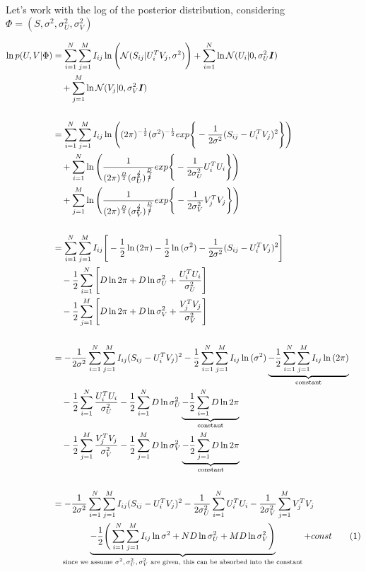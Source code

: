 Let's work with the log of the posterior distribution, considering $\Phi = (S,\sigma^{2},\sigma_{U}^{2},\sigma_{V}^{2})$

\begin{align*}
\ln{p(U,V|\Phi)} &= \sum_{i=1}^{N}\sum_{j=1}^{M} I_{ij}\ln{\Bigg(\mathcal{N}(S_{ij}|U^{T}_{i}V_{j},\sigma^{2})\Bigg)} + \sum_{i=1}^{N}\ln{\mathcal{N}(U_{i}|0,\sigma_{U}^{2}\boldsymbol{I})} \\&\quad 
+ \sum_{j=1}^{M}\ln{\mathcal{N}(V_{j}|0,\sigma_{V}^{2}\boldsymbol{I})}\\
&\\
&= \sum_{i=1}^{N}\sum_{j=1}^{M} I_{ij}\ln{\Bigg( (2\pi)^{-\frac{1}{2}}(\sigma^{2})^{-\frac{1}{2}} exp\Bigg\{-\frac{1}{2\sigma^{2}}(S_{ij} - U_{i}^{T}V_{j})^{2} \Bigg\}  \Bigg)} \\&\quad
+ \sum_{i=1}^{N} \ln{ \Bigg( \frac{1}{(2\pi)^{\frac{D}{2}}(\sigma_{U}^{\cancel{2}})^{\frac{D}{\cancel{2}}}} exp\Bigg\{ -\frac{1}{2\sigma_{U}^{2}} U_{i}^{T}U_{i} \Bigg\} \Bigg) } \\&\quad
+ \sum_{j=1}^{M} \ln{ \Bigg( \frac{1}{(2\pi)^{\frac{D}{2}}(\sigma_{V}^{\cancel{2}})^{\frac{D}{\cancel{2}}}} exp\Bigg\{ -\frac{1}{2\sigma_{V}^{2}} V_{j}^{T}V_{j} \Bigg\} \Bigg) }\\
&\\
&= \sum_{i=1}^{N}\sum_{j=1}^{M} I_{ij}\Bigg[-\frac{1}{2}\ln{(2\pi)} -\frac{1}{2}\ln{(\sigma^{2}) -\frac{1}{2\sigma^{2}}(S_{ij} - U_{i}^{T}V_{j})^{2}\Bigg]} \\&\quad
-\frac{1}{2} \sum_{i=1}^{N}\Bigg[ D\ln{2\pi} + D\ln{\sigma_{U}^{2}} + \frac{U_{i}^{T}U_{i}}{\sigma_{U}^{2}} \Bigg] \\&\quad
-\frac{1}{2} \sum_{j=1}^{M}\Bigg[ D\ln{2\pi} + D\ln{\sigma_{V}^{2}} + \frac{V_{j}^{T}V_{j}}{\sigma_{V}^{2}} \Bigg] \\
\\
&= -\frac{1}{2\sigma^{2}}\sum_{i=1}^{N}\sum_{j=1}^{M} I_{ij}(S_{ij} - U_{i}^{T}V_{j})^{2} -\frac{1}{2}\sum_{i=1}^{N}\sum_{j=1}^{M} I_{ij}\ln{(\sigma^{2})} \underbrace{-\frac{1}{2}\sum_{i=1}^{N}\sum_{j=1}^{M} I_{ij}\ln{(2\pi)}}_\text{constant} \\&\quad
-\frac{1}{2} \sum_{i=1}^{N}  \frac{U_{i}^{T}U_{i}}{\sigma_{U}^{2}} -\frac{1}{2} \sum_{i=1}^{N} D\ln{\sigma_{U}^{2}} \underbrace{-\frac{1}{2} \sum_{i=1}^{N} D\ln{2\pi}}_\text{constant} \\&\quad
-\frac{1}{2} \sum_{j=1}^{M}  \frac{V_{j}^{T}V_{j}}{\sigma_{V}^{2}} -\frac{1}{2} \sum_{j=1}^{M} D\ln{\sigma_{V}^{2}} \underbrace{-\frac{1}{2} \sum_{j=1}^{M} D\ln{2\pi}}_\text{constant}\\
\\
&= -\frac{1}{2\sigma^{2}}\sum_{i=1}^{N}\sum_{j=1}^{M} I_{ij}(S_{ij} - U_{i}^{T}V_{j})^{2} - \frac{1}{2\sigma_{U}^{2}} \sum_{i=1}^{N} U_{i}^{T}U_{i} -\frac{1}{2\sigma_{V}^{2}} \sum_{j=1}^{M} V_{j}^{T}V_{j} \\&\quad
\underbrace{-\frac{1}{2}\Bigg( \sum_{i=1}^{N}\sum_{j=1}^{M} I_{ij}\ln{\sigma^{2}} + ND\ln{\sigma_{U}^2} + MD\ln{\sigma_{V}^2}\Bigg)}_\text{since we assume $\sigma^{2},\sigma_{U}^{2},\sigma_{V}^{2}$ are given, this can be absorbed into the constant} + const\tag{\stepcounter{equation}\theequation}
\end{align*}

